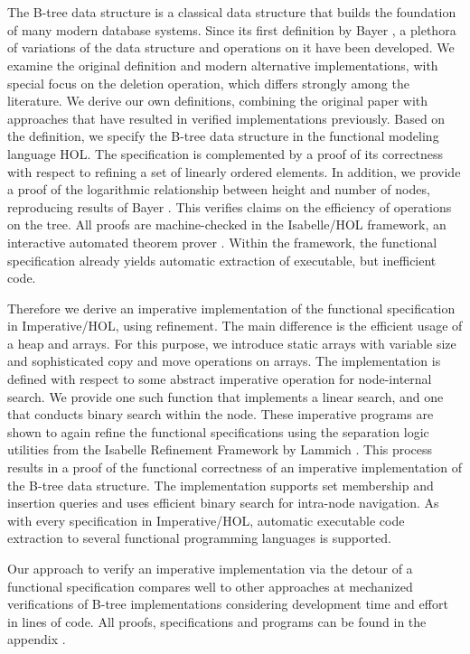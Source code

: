 \chapter{\abstractname}

The B-tree data structure is a classical data structure
that builds the foundation of many modern database systems.
Since its first definition by Bayer \parencite{DBLP:journals/acta/BayerM72},
a plethora of variations of the data structure and operations on it have been developed.
We examine the original definition and modern alternative implementations,
with special focus on the deletion operation, which differs strongly among the literature.
We derive our own definitions, combining the original paper
with approaches that have resulted in verified implementations previously.
Based on the definition, we specify the B-tree data structure in the
functional modeling language HOL.
The specification is complemented by a proof of its correctness
with respect to refining a set of linearly ordered elements.
In addition, we provide a proof of the logarithmic relationship between height and number of nodes,
reproducing results of Bayer \parencite{DBLP:journals/acta/BayerM72}.
This verifies claims on the efficiency of
operations on the tree.
All proofs are machine-checked in the Isabelle/HOL framework,
an interactive automated theorem prover \parencite{DBLP:books/sp/NipkowK14}.
Within the framework,
the functional specification already yields automatic extraction of executable,
but inefficient code.

Therefore we derive an imperative implementation of the functional specification
in Imperative/HOL, using refinement.
The main difference is the efficient usage of a heap and arrays.
For this purpose, we introduce static arrays with variable size
and sophisticated copy and move operations on arrays.
The implementation is defined with respect to some abstract imperative
operation for node-internal search.
We provide one such function that implements a linear search,
and one that conducts binary search within the node.
These imperative programs are shown to again refine the functional specifications
using the separation logic utilities from the Isabelle Refinement Framework by
Lammich \parencite{DBLP:journals/jar/Lammich19}.
This process results in a proof of the functional correctness
of an imperative implementation of the B-tree data structure.
The implementation supports set membership and insertion queries
and uses efficient binary search for intra-node navigation.
As with every specification in Imperative/HOL,
automatic executable code extraction to
several functional programming languages is supported.

Our approach to verify an imperative implementation
via the detour of a functional specification
compares well to other approaches at mechanized
verifications of B-tree implementations
considering development time and effort in lines of code.
All proofs, specifications and programs can be found in the appendix \parencite{MuendlerAppendix21}.




